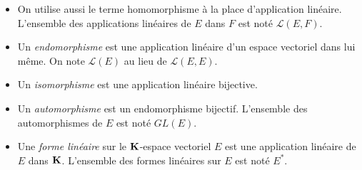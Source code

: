 \begin{defi}
\begin{itemize}
  \item On utilise aussi le terme homomorphisme à la place d'\og application linéaire\fg. L'ensemble des applications linéaires de $E$ dans $F$ est noté $\mathcal{L}(E,F)$.
\item Un \emph{endomorphisme}  est une application linéaire d'un espace vectoriel dans lui même. On note $\mathcal{L}(E)$ au lieu de $\mathcal{L}(E,E)$.
\item Un \emph{isomorphisme}  est une application linéaire bijective.
\item Un \emph{automorphisme}  est un endomorphisme bijectif. L'ensemble des automorphismes de $E$ est noté $GL(E)$.
\item Une \emph{forme linéaire}  sur le $\mathbf{K}$-espace vectoriel $E$ est une application linéaire de $E$ dans $\mathbf{K}$. L'ensemble des formes linéaires sur $E$ est noté $E^*$.
\end{itemize}
\end{defi}
